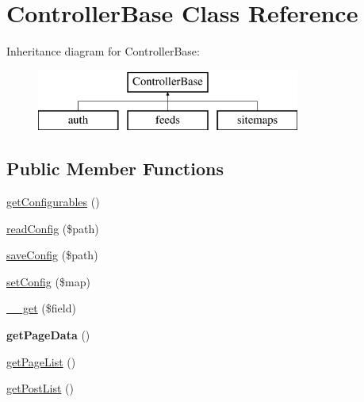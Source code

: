 \hypertarget{classControllerBase}{\section{Controller\-Base Class Reference}
\label{classControllerBase}
}
Inheritance diagram for Controller\-Base\-:\begin{figure}[H]
\begin{center}
\leavevmode
\includegraphics[height=2.000000cm]{classControllerBase}
\end{center}
\end{figure}
\subsection*{Public Member Functions}
\begin{DoxyCompactItemize}
\item 
\hyperlink{classControllerBase_adf22b33f94d79eadbae786f31fdb4b8b}{get\-Configurables} ()
\item 
\hyperlink{classControllerBase_a3de3699fd3f729abfc5fa59decef958f}{read\-Config} (\$path)
\item 
\hyperlink{classControllerBase_ae75dea3157d019d04c663481c60ff201}{save\-Config} (\$path)
\item 
\hyperlink{classControllerBase_afd930559882de5e0d77c5357e07f1af4}{set\-Config} (\$map)
\item 
\hyperlink{classControllerBase_add5cf51bbc1b21b6cea292aed3cb6b29}{\-\_\-\-\_\-get} (\$field)
\item 
\hypertarget{classControllerBase_ad017b0ed4dcdc83cdfa052ceb288366a}{{\bfseries get\-Page\-Data} ()}\label{classControllerBase_ad017b0ed4dcdc83cdfa052ceb288366a}

\item 
\hyperlink{classControllerBase_aae0d40bf6721d92c1a2285ba8edd5ebf}{get\-Page\-List} ()
\item 
\hyperlink{classControllerBase_a0cff8483987ef3926f543d46368a62bf}{get\-Post\-List} ()
\end{DoxyCompactItemize}
